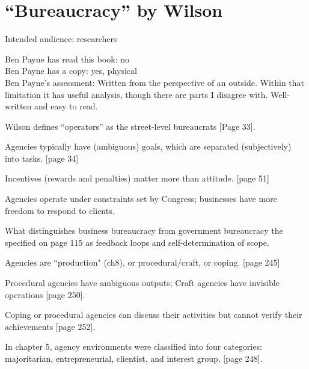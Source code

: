 \section{``Bureaucracy'' by Wilson}

\cite{1991_Wilson}

Intended audience: researchers

Ben Payne has read this book: no\\
Ben Payne has a copy: yes, physical\\
Ben Payne's assessment: Written from the perspective of an outside. Within that limitation it has useful analysis, though there are parts I disagree with. Well-written and easy to read.


Wilson defines ``operators'' as the street-level bureaucrats [Page 33].

Agencies typically have (ambiguous) goals, which are separated (subjectively) into tasks. [page 34]

Incentives (rewards and penalties) matter more than attitude.
[page 51]

Agencies operate under constraints set by Congress; businesses have more freedom to respond to clients.

What distinguishes business bureaucracy from government bureaucracy the specified on page 115 as feedback loops and self-determination of scope.

Agencies are ``production" (ch8), or procedural/craft, or coping.
[page 245]

Procedural agencies have ambiguous outputs; Craft agencies have invisible operations
[page 250].

Coping or procedural agencies can discuss their activities but cannot verify their achievements
[page 252].

In chapter 5, agency environments were classified into four categories: majoritarian, entrepreneurial, clientist, and interest group.
[page 248].
